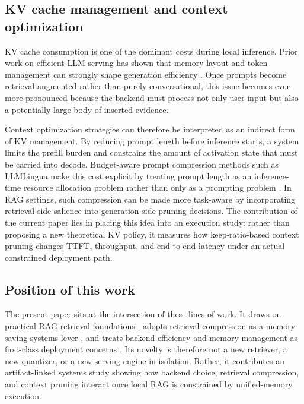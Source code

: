 \documentclass[10pt,twocolumn]{article}
\begin{document}
\subsection{KV cache management and context optimization}

KV cache consumption is one of the dominant costs during local inference. Prior work on efficient LLM serving has shown that memory layout and token management can strongly shape generation efficiency \cite{kwon2023vllm}. Once prompts become retrieval-augmented rather than purely conversational, this issue becomes even more pronounced because the backend must process not only user input but also a potentially large body of inserted evidence.

Context optimization strategies can therefore be interpreted as an indirect form of KV management. By reducing prompt length before inference starts, a system limits the prefill burden and constrains the amount of activation state that must be carried into decode. Budget-aware prompt compression methods such as LLMLingua make this cost explicit by treating prompt length as an inference-time resource allocation problem rather than only as a prompting problem \cite{jiang2023llmlingua}. In RAG settings, such compression can be made more task-aware by incorporating retrieval-side salience into generation-side pruning decisions. The contribution of the current paper lies in placing this idea into an execution study: rather than proposing a new theoretical KV policy, it measures how keep-ratio-based context pruning changes TTFT, throughput, and end-to-end latency under an actual constrained deployment path.

\subsection{Position of this work}

The present paper sits at the intersection of these lines of work. It draws on practical RAG retrieval foundations \cite{gao2023rag,robertson2009bm25,cormack2009rrf}, adopts retrieval compression as a memory-saving systems lever \cite{zandieh2025turboquant}, and treats backend efficiency and memory management as first-class deployment concerns \cite{kwon2023vllm,hannun2023mlx}. Its novelty is therefore not a new retriever, a new quantizer, or a new serving engine in isolation. Rather, it contributes an artifact-linked systems study showing how backend choice, retrieval compression, and context pruning interact once local RAG is constrained by unified-memory execution.
\end{document}
